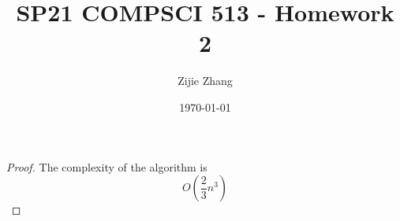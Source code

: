 \documentclass{article}
\title{SP21 COMPSCI 513 - Homework 2}
\author{Zijie Zhang}
\date\today
\begin{document}
\maketitle

\begin{proof}
	The complexity of the algorithm is $$O(\frac{2}{3}n^3)$$
\end{proof}
\end{document}
